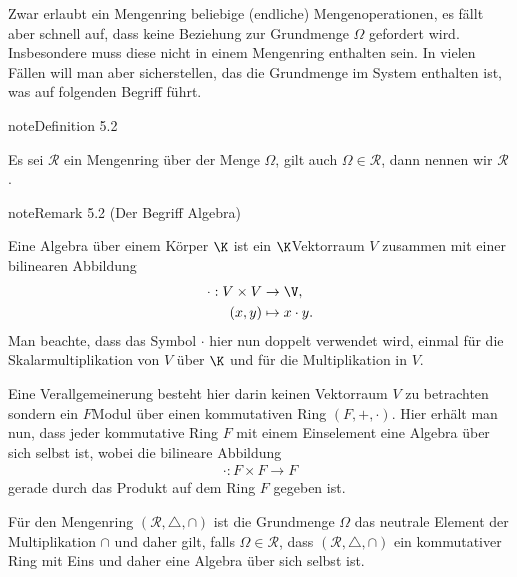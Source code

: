 \documentclass[letterpaper,10pt,german]{jupyterBook}
\begin{document}
\sphinxAtStartPar
Zwar erlaubt ein Mengenring beliebige (endliche) Mengenoperationen, es fällt aber schnell auf, dass keine Beziehung zur Grundmenge \(\Omega\) gefordert wird. Insbesondere muss diese nicht in einem Mengenring enthalten sein. In vielen Fällen will man aber sicherstellen, das die Grundmenge im System enthalten ist, was auf folgenden Begriff führt.
\label{masstheorie/masstheorie:definition-3}
\begin{sphinxadmonition}{note}{Definition 5.2}



\sphinxAtStartPar
Es sei \(\mathcal{R}\) ein Mengenring über der Menge \(\Omega\), gilt auch \(\Omega\in\mathcal{R}\), dann nennen wir \(\mathcal{R}\) .
\end{sphinxadmonition}
\label{masstheorie/masstheorie:remark-4}
\begin{sphinxadmonition}{note}{Remark 5.2 (Der Begriff Algebra)}



\sphinxAtStartPar
Eine Algebra über einem Körper \(\K\) ist ein \(\K\)\sphinxhyphen{}Vektorraum \(V\) zusammen mit einer bilinearen Abbildung
\begin{equation*}
\begin{split}\cdot:V\times V&\to \V,\\
(x,y)&\mapsto x\cdot y.\end{split}
\end{equation*}
\sphinxAtStartPar
Man beachte, dass das Symbol \(\cdot\) hier nun doppelt verwendet wird, einmal für die Skalarmultiplikation von \(V\) über \(\K\) und für die Multiplikation in \(V\).

\sphinxAtStartPar
Eine Verallgemeinerung besteht hier darin keinen Vektorraum \(V\) zu betrachten sondern ein \(F\)\sphinxhyphen{}Modul über einen kommutativen Ring \((F,+,\cdot)\). Hier erhält man nun, dass jeder kommutative Ring \(F\) mit einem Einselement eine Algebra über sich selbst ist, wobei die bilineare Abbildung
\begin{equation*}
\begin{split}\cdot:F\times F\to F\end{split}
\end{equation*}
\sphinxAtStartPar
gerade durch das Produkt auf dem Ring \(F\) gegeben ist.

\sphinxAtStartPar
Für den Mengenring \((\mathcal{R},\triangle, \cap)\) ist die Grundmenge \(\Omega\) das neutrale Element der Multiplikation \(\cap\) und daher gilt, falls \(\Omega\in\mathcal{R}\), dass \((\mathcal{R},\triangle, \cap)\) ein kommutativer Ring mit Eins und daher eine Algebra über sich selbst ist.
\end{sphinxadmonition}
\end{document}
